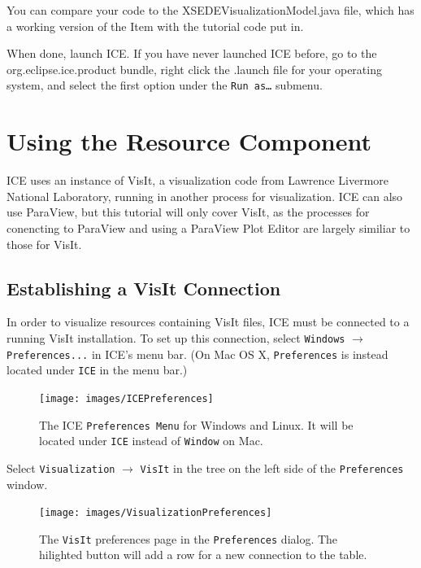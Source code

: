 You can compare your code to the XSEDEVisualizationModel.java file, which has
a working version of the Item with the tutorial code put in. 

When done, launch ICE. If you have never launched ICE before, go to the
org.eclipse.ice.product bundle, right click the .launch file for your operating
system, and select the first option under the \texttt{Run as\ldots} submenu.

\section{Using the Resource Component}

ICE uses an instance of VisIt, a visualization code from Lawrence Livermore
National Laboratory, running in another process for visualization. ICE can also
use ParaView, but this tutorial will only cover VisIt, as the processes for
conencting to ParaView and using a ParaView Plot Editor are largely similiar to
those for VisIt.

\subsection{Establishing a VisIt Connection}

In order to visualize resources containing VisIt files, ICE must be connected to
a running VisIt installation. To set up this connection, select \texttt{Windows}
$\rightarrow$ \texttt{Preferences...} in ICE's menu bar. (On Mac OS X,
\texttt{Preferences} is instead located under \texttt{ICE} in the menu
bar.)

\begin{figure}[!h]
\texttt{[image: images/ICEPreferences]}
\centering
\caption{The ICE \texttt{Preferences Menu} for Windows and Linux. It will be
located under \texttt{ICE} instead of \texttt{Window} on Mac.}
\label{fig:icepreferences}
\end{figure}


Select \texttt{Visualization} $\rightarrow$ \texttt{VisIt} in the tree on the
left side of the \texttt{Preferences} window.

\begin{figure}[!h]
\texttt{[image: images/VisualizationPreferences]}
\centering
\caption{The \texttt{VisIt} preferences page in the \texttt{Preferences}
dialog. The hilighted button will add a row for a new connection to the table.}
\label{fig:visualizationpreferences}
\end{figure}


